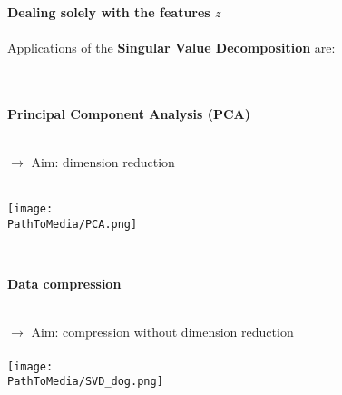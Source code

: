 \begin{frame}
\textbf{\large \color{header} Dealing solely with the features $z$}~~\\~\\
 Applications of the \textbf{Singular Value Decomposition} are:\\
~\\~\\
 \begin{minipage}[t]{0.48\textwidth}
 \textbf{\color{header}Principal Component Analysis (PCA)}\\~\\
 {\raggedright
  $\rightarrow$ Aim: dimension reduction\\~\\}
  {\centering\texttt{[image: \\PathToMedia/PCA.png]}}
 \end{minipage}
~~~~~
 \begin{minipage}[t]{0.48\textwidth}
 \textbf{\color{header}Data compression}\\~\\
 \raggedright
 $\rightarrow$ Aim: compression without dimension reduction\\~\\
{ \centering\texttt{[image: \\PathToMedia/SVD\_dog.png]}}
\end{minipage}
\end{frame}
%
